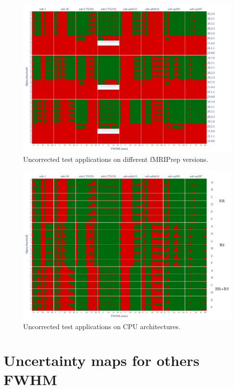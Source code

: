 \documentclass{article}
\newcommand{\fmriprep}{fMRIPrep\xspace}
\begin{document}
\begin{appendices}
    \begin{figure}
        \centering
        \includegraphics[width=\linewidth]{figures/fmriprep-versions/pce.pdf}
        \caption{Uncorrected test applications on different \fmriprep versions.}
        \label{fig:versions_pce}
    \end{figure}

    \begin{figure}
        \centering
        \includegraphics[width=\linewidth]{figures/arch/arch_pce_.pdf}
        \caption{Uncorrected test applications on CPU architectures.}
        \label{fig:arch_pce}
    \end{figure}


    \section{Uncertainty maps for others FWHM}


\end{appendices}
\end{document}
